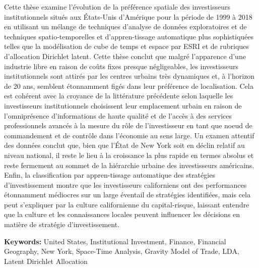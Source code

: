 \documentclass[12pt,twoside]{report}
\numberwithin{figure}{chapter}
\newenvironment{preliminary}%
{\pagestyle{plain}\pagenumbering{roman}}%
{\pagenumbering{arabic}}
\begin{document}
\begin{preliminary}
\begin{spacing}{2}
Cette th\`{e}se examine l'\'{e}volution de la pr\'{e}f\'{e}rence spatiale des investisseurs institutionnels situ\'{e}s aux \'{E}tats-Unis d'Am\'{e}rique pour la p\'{e}riode de 1999 \`{a} 2018 en utilisant un m\'{e}lange de techniques d'analyse de donn\'{e}es exploratoires et de techniques spatio-temporelles et d'appren-tissage automatique plus sophistiqu\'{e}es telles que la mod\'{e}lisation de cube de temps et espace par ESRI et de rubriques d'allocation Dirichlet latent. Cette th\`{e}se conclut que malgr\'{e} l'apparence d'une industrie libre en raison de co\^{u}ts fixes presque n\'{e}gligeables, les investisseurs institutionnels sont attir\'{e}s par les centres urbains tr\`{e}s dynamiques et, \`{a} l'horizon de 20 ans, semblent \'{e}tonnamment fig\'{e}s dans leur pr\'{e}f\'{e}rence de localisation. Cela est coh\'{e}rent avec la croyance de la litt\'{e}rature pr\'{e}c\'{e}dente selon laquelle les investisseurs institutionnels choisissent leur emplacement urbain en raison de l'omnipr\'{e}sence d'informations de haute qualit\'{e} et de l'acc\`{e}s \`{a} des services professionnels avanc\'{e}s \`{a} la mesure du r\^{o}le de l'investisseur en tant que noeud de commandement et de contr\^{o}le dans l'\'{e}conomie au sens large. Un examen attentif des donn\'{e}es conclut que, bien que l'\'{E}tat de New York soit en d\'{e}clin relatif au niveau national, il reste le lieu \`{a} la croissance la plus rapide en termes absolus et reste fermement au sommet de la hi\'{e}rarchie urbaine des investisseurs am\'{e}ricains. Enfin, la classification par appren-tissage automatique des strat\'{e}gies d'investissement montre que les investisseurs californiens ont des performances \'{e}tonnamment m\'{e}diocres sur un large \'{e}ventail de strat\'{e}gies identifi\'{e}es, mais cela peut s'expliquer par la culture californienne du capital-risque, laissant entendre que la culture et les connaissances locales peuvent influencer les d\'{e}cisions en mati\`{e}re de strat\'{e}gie d'investissement.
\end{spacing}

\vfill
\textbf{Keywords:} United States, Institutional Investment, Finance, Financial Geography, New York, Space-Time Analysis, Gravity Model of Trade, LDA, Latent Dirichlet Allocation 
\newpage


\end{preliminary}
\end{document}
